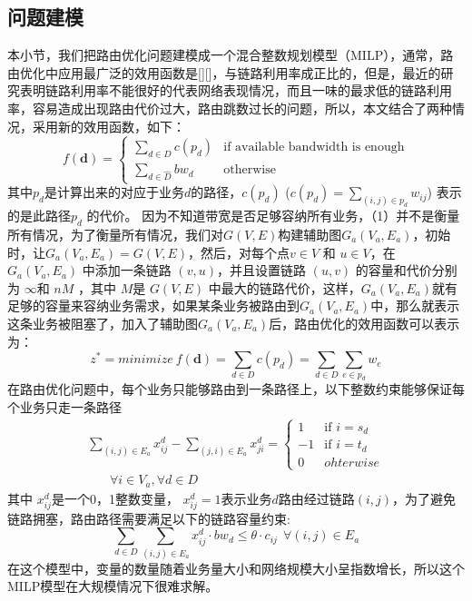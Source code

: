 \subsection{问题建模}
本小节，我们把路由优化问题建模成一个混合整数规划模型（MILP），通常，路由优化中应用最广泛的效用函数是[][]，与链路利用率成正比的，但是，最近的研究表明链路利用率不能很好的代表网络表现情况，而且一味的最求低的链路利用率，容易造成出现路由代价过大，路由跳数过长的问题，所以，本文结合了两种情况，采用新的效用函数，如下：
\begin{equation}\label{Obj1}
f(\mathbf{d})=\begin{cases}
\sum\limits_{d \in D} c(p_d) & \text{if available bandwidth is enough}\\
\sum\limits_{d \in \hat{D}} bw_{d}& \text{otherwise
}
\end{cases}
\end{equation}
其中$p_d$是计算出来的对应于业务$d$的路径，$c(p_d)$ ($c(p_d) = \sum_{(i,j)\in p_d} w_{ij}$) 表示的是此路径$p_d$ 的代价。
因为不知道带宽是否足够容纳所有业务，（1）并不是衡量所有情况，为了衡量所有情况，我们对$G(V, E)$构建辅助图$G_a(V_a, E_a)$，初始时，让$G_a(V_a, E_a) = G(V, E)$，然后，对每个点$v \in V$ 和 $u \in V$，在$G_a(V_a, E_a)$ 中添加一条链路 $(v, u)$，并且设置链路 $(u,v)$ 的容量和代价分别为 $\infty$和 $nM$ ，其中 $M$是 $G(V, E)$ 中最大的链路代价，这样，$G_a(V_a, E_a)$就有足够的容量来容纳业务需求，如果某条业务被路由到$G_a(V_a, E_a)$中，那么就表示这条业务被阻塞了，加入了辅助图$G_a(V_a, E_a)$后，路由优化的效用函数可以表示为：
\begin{equation}\label{Obj2}
z^* = minimize~f(\mathbf{d})=
\sum\limits_{d \in D} c(p_d)=  \sum\limits_{d \in D}\sum\limits_{e \in p_d} w_e
\end{equation}
在路由优化问题中，每个业务只能够路由到一条路径上，以下整数约束能够保证每个业务只走一条路径
\begin{equation}\label{FlowConv}
\begin{split}
\sum\limits_{(i,j) \in E_a} x_{ij}^d - \sum\limits_{(j,i) \in E_a} x_{ji}^d
=\begin{cases}
1 & \text{if $i = s_d$}\\
-1 & \text{if $i = t_d$} \\
0 &{ohterwise}
\end{cases}
\\~~~~~~~~\forall i\in V_a, \forall d\in D
\end{split}
\end{equation}
其中 $x_{ij}^d$是一个0，1整数变量， $x_{ij}^d=1$表示业务$d$路由经过链路$(i,j)$，为了避免链路拥塞，路由路径需要满足以下的链路容量约束:
\begin{equation}\label{Capcon}
\sum\limits_{d \in D}\sum\limits_{(i,j) \in E_a} x_{ij}^d \cdot bw_d \le \theta\cdot c_{ij} ~~\forall (i,j)\in E_a
\end{equation}
在这个模型中，变量的数量随着业务量大小和网络规模大小呈指数增长，所以这个MILP模型在大规模情况下很难求解。
